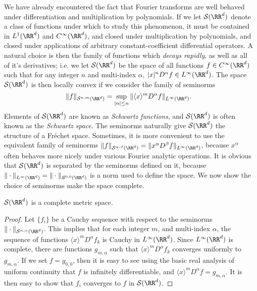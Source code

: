 We have already encountered the fact that Fourier transforms are well behaved under differentiation and multiplication by polynomials. If we let $\mathcal{S}(\RR^d)$ denote a class of functions under which to study this phenomenon, it must be contained in $L^1(\RR^d)$ and $C^\infty(\RR^d)$, and closed under multiplication by polynomials, and closed under applications of arbitrary constant-coefficient differential operators. A natural choice is then the family of functions which \emph{decays rapidly}, as well as all of it's derivatives; i.e. we let $\mathcal{S}(\RR^d)$ be the space of all functions $f \in C^\infty(\RR^d)$ such that for any integer $n$ and multi-index $\alpha$, $|x|^n D^\alpha f \in L^\infty(\RR^d)$. The space $\mathcal{S}(\RR^d)$ is then locally convex if we consider the family of seminorms
%
\[ \| f \|_{\mathcal{S}^{n,m}(\RR^d)} = \sup_{|\alpha| \leq n} \| \langle x \rangle^m D^\alpha f \|_{L^\infty(\RR^d)}. \]
%
Elements of $\mathcal{S}(\RR^d)$ are known as \emph{Schwartz functions}, and $\mathcal{S}(\RR^d)$ is often known as the \emph{Schwartz space}. The seminorms naturally give $\mathcal{S}(\RR^d)$ the structure of a Fr\'{e}chet space. Sometimes, it is more convenient to use the equivalent family of seminorms $\| f \|_{\mathcal{S}^{\alpha, \beta}(\RR^d)} = \| x^\alpha D^\beta f \|_{L^\infty(\RR^d)}$, because $x^\alpha$ often behaves more nicely under various Fourier analytic operations. It is obvious that $\mathcal{S}(\RR^d)$ is separated by the seminorms defined on it, because $\| \cdot \|_{L^\infty(\RR^d)} = \| \cdot \|_{\mathcal{S}^{0,0}(\RR^d)}$ is a norm used to define the space. We now show the choice of seminorms make the space complete.

\begin{theorem}
    $\mathcal{S}(\RR^d)$ is a complete metric space.
\end{theorem}
\begin{proof}
    Let $\{ f_i \}$ be a Cauchy sequence with respect to the seminorms $\| \cdot \|_{\mathcal{S}^{n,\alpha}(\RR^d)}$. This implies that for each integer $m$, and multi-index $\alpha$, the sequence of functions $\langle x \rangle^m D^\alpha f_k$ is Cauchy in $L^\infty(\RR^d)$. Since $L^\infty(\RR^d)$ is complete, there are functions $g_{m,\alpha}$ such that $\langle x \rangle^m D^\alpha f_k$ converges uniformly to $g_{m,\alpha}$. If we set $f = g_{0,0}$, then it is easy to see using the basic real analysis of uniform continuity that $f$ is infinitely differentiable, and $\langle x \rangle^m D^\alpha f = g_{m,\alpha}$. It is then easy to show that $f_i$ converges to $f$ in $\mathcal{S}(\RR^d)$.
\end{proof}

